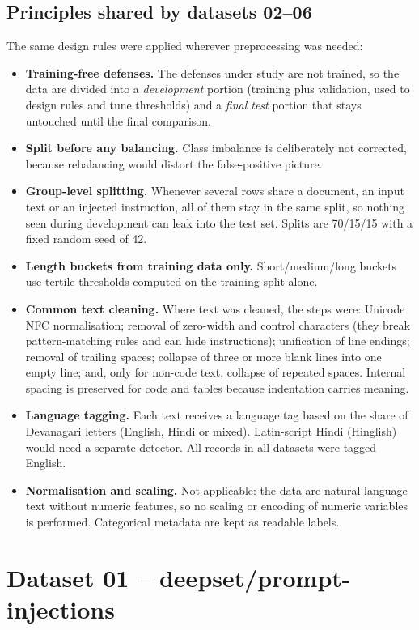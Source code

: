 \documentclass[11pt,a4paper]{article}
\begin{document}
\subsection{Principles shared by datasets 02--06}
The same design rules were applied wherever preprocessing was needed:
\begin{itemize}
\item \textbf{Training-free defenses.} The defenses under study are not trained, so the data are divided into a \emph{development} portion (training plus validation, used to design rules and tune thresholds) and a \emph{final test} portion that stays untouched until the final comparison.
\item \textbf{Split before any balancing.} Class imbalance is deliberately not corrected, because rebalancing would distort the false-positive picture.
\item \textbf{Group-level splitting.} Whenever several rows share a document, an input text or an injected instruction, all of them stay in the same split, so nothing seen during development can leak into the test set. Splits are 70/15/15 with a fixed random seed of 42.
\item \textbf{Length buckets from training data only.} Short/medium/long buckets use tertile thresholds computed on the training split alone.
\item \textbf{Common text cleaning.} Where text was cleaned, the steps were: Unicode NFC normalisation; removal of zero-width and control characters (they break pattern-matching rules and can hide instructions); unification of line endings; removal of trailing spaces; collapse of three or more blank lines into one empty line; and, only for non-code text, collapse of repeated spaces. Internal spacing is preserved for code and tables because indentation carries meaning.
\item \textbf{Language tagging.} Each text receives a language tag based on the share of Devanagari letters (English, Hindi or mixed). Latin-script Hindi (Hinglish) would need a separate detector. All records in all datasets were tagged English.
\item \textbf{Normalisation and scaling.} Not applicable: the data are natural-language text without numeric features, so no scaling or encoding of numeric variables is performed. Categorical metadata are kept as readable labels.
\end{itemize}

\section{Dataset 01 -- deepset/prompt-injections}
\end{document}
